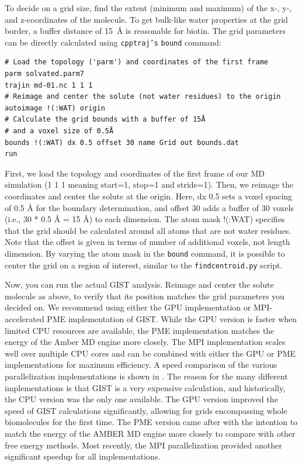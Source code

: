 \documentclass[9pt,tutorial]{livecoms}
\newcommand{\software}{\texttt}
\newcommand\inlinecode{\texttt}
\begin{document}
To decide on a grid size, find the extent (minimum and maximum) of the x-, \mbox{y-,} and z-coordinates of the molecule.
To get bulk-like water properties at the grid border, a buffer distance of \qty{15}{\angstrom} is reasonable for biotin.
The grid parameters can be directly calculated using \software{cpptraj's} \inlinecode{bound} command:
\begin{lstlisting}[style=cpptraj]
# Load the topology ('parm') and coordinates of the first frame
parm solvated.parm7
trajin md-01.nc 1 1 1
# Reimage and center the solute (not water residues) to the origin
autoimage !(:WAT) origin
# Calculate the grid bounds with a buffer of 15Å
# and a voxel size of 0.5Å
bounds !(:WAT) dx 0.5 offset 30 name Grid out bounds.dat
run
\end{lstlisting}
First, we load the topology and coordinates of the first frame of our MD simulation (1 1 1 meaning start=1, stop=1 and stride=1).
Then, we reimage the coordinates and center the solute at the origin.
Here, dx 0.5 sets a voxel spacing of 0.5 Å for the boundary determination, and offset 30 adds a buffer of 30 voxels (i.e., 30 * 0.5 Å = 15 Å) to each dimension.
The atom mask !(:WAT) specifies that the grid should be calculated around all atoms that are not water residues.
Note that the offset is given in terms of number of additional voxels, not length dimension. 
By varying the atom mask in the \inlinecode{bound} command, it is possible to center the grid on a region of interest, similar to the \software{findcentroid.py} script.

Now, you can run the actual GIST analysis.
Reimage and center the solute molecule as above, to verify that its position matches the grid parameters you decided on.
We recommend using either the GPU implementation or MPI-accelerated PME implementation of GIST.
While the GPU version is faster when limited CPU resources are available, the PME implementation matches the energy of the Amber MD engine more closely.
The MPI implementation \cite{Roe2023-mpi-gist} scales well over multiple CPU cores and can be combined with either the GPU or PME implementations for maximum efficiency. 
A speed comparison of the various parallelization implementations is shown in \cite{Roe2023-mpi-gist}.
The reason for the many different implementations is that GIST is a very expensive calculation, and historically, the CPU version was the only one available.
The GPU version improved the speed of GIST calculations significantly, allowing for grids encompassing whole biomolecules for the first time.
The PME version came after with the intention to match the energy of the AMBER MD engine more closely to compare with other free energy methods.
Most recently, the MPI parallelization provided another significant speedup for all implementations.
\end{document}
